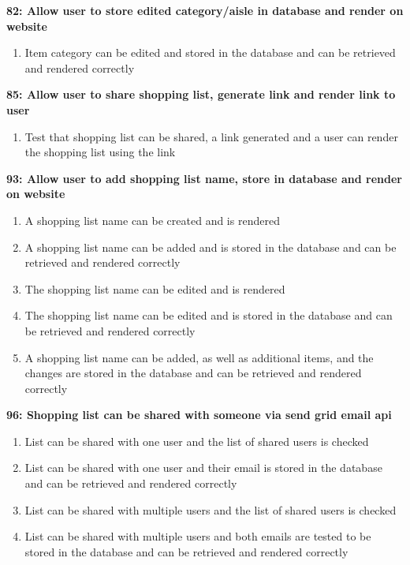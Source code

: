 \documentclass[10pt,onecolumn]{witseiepaper}
\begin{document}
\textbf{82: Allow user to store edited category/aisle in database and render on website}

\begin{enumerate}
	\item Item category can be edited and stored in the database and can be retrieved and rendered correctly
\end{enumerate}

\textbf{85: Allow user to share shopping list, generate link and render link to user}

\begin{enumerate}
	\item Test that shopping list can be shared, a link generated and a user can render the shopping list using the link
\end{enumerate}

\textbf{93: Allow user to add shopping list name, store in database and render on website}

\begin{enumerate}
	\item A shopping list name can be created and is rendered
	\item A shopping list name can be added and is stored in the database and can be retrieved and rendered correctly
	\item The shopping list name can be edited and is rendered
	\item The shopping list name can be edited and is stored in the database and can be retrieved and rendered correctly
	\item  A shopping list name can be added, as well as additional items, and the changes are stored in the database and can be retrieved and rendered correctly
\end{enumerate}

\textbf{96: Shopping list can be shared with someone via send grid email api}
\begin{enumerate}
	\item List can be shared with one user and the list of shared users is checked
	\item List can be shared with one user and their email is stored in the database and can be retrieved and rendered correctly
	\item List can be shared with multiple users and the list of shared users is checked
	\item List can be shared with multiple users and both emails are tested to be stored in the database and can be retrieved and rendered correctly
\end{enumerate}
\end{document}
